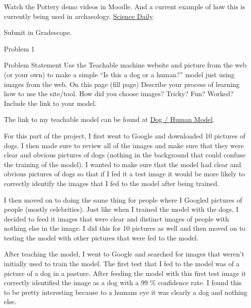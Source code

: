 Watch the Pottery demo videos in Moodle. And a current example of how this is currently being used in archaeology. \href{https://www.sciencedaily.com/releases/2021/05/210517144704.htm}{Science Daily}. \vspace*{1em}

\noindent Submit in Gradescope.

\begin{problem}{Problem 1}
    \begin{statement}{Problem Statement}
        Use the Teachable machine website and picture from the web (or your own) to make a simple “Is this a dog or a human?” model just using images from the web. On this page (fill page) Describe 
        your process of learning how to use the site/tool. How did you choose images? Tricky? Fun? Worked? Include the link to your model.
    \end{statement}

    \begin{Highlight}[Solution]
        \begin{spacing}{1.50}
            The link to my teachable model can be found at \href{https://teachablemachine.withgoogle.com/models/seDY1zadK/}{Dog / Human Model}.
            
            For this part of the project, I first went to Google and downloaded 10 pictures of dogs. I then made sure to review all of the images and make sure that they were clear and obvious pictures 
            of dogs (nothing in the background that could confuse the training of the model). I wanted to make sure that the model had clear and obvious pictures of dogs so that if I fed it a test image
            it would be more likely to correctly identify the images that I fed to the model after being trained.

            I then moved on to doing the same thing for people where I Googled pictures of people (mostly celebrities). Just like when I trained the model with the dogs, I decided to feed it images
            that were clear and distinct images of people with nothing else in the image. I did this for 10 pictures as well and then moved on to testing the model with other pictures that were fed to the
            model.

            After teaching the model, I went to Google and searched for images that weren't initially used to train the model. The first test that I fed to the model was of a picture of a dog in a pasture.
            After feeding the model with this first test image it correctly identified the image as a dog with a 99 \% confidence rate. I found this to be pretty interesting because to a humans eye it was
            clearly a dog and nothing else.


\end{spacing}
\end{Highlight}
\end{problem}
